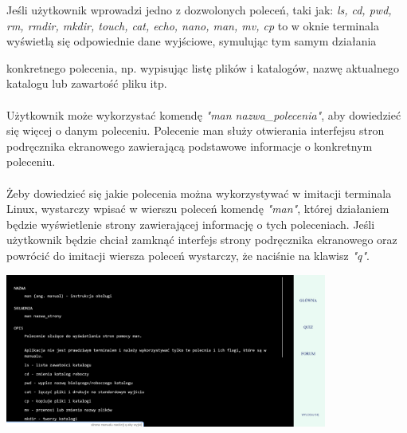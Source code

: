 \documentclass[10pt,a4paper]{report}
\begin{document}
\begin{adjustwidth}{2cm}{2cm}
\begin{minipage}{\linewidth}
\begin{center}
\end{center}
\end{minipage}
\begin{minipage}{1\linewidth}
\vspace{0.3cm}
 Jeśli użytkownik wprowadzi jedno z dozwolonych poleceń, taki jak: \textit{ls, cd, pwd, rm, rmdir, mkdir, touch, cat, echo, nano, man, mv, cp } to w oknie terminala wyświetlą się odpowiednie dane wyjściowe, symulując tym samym działania
 \end{minipage}
 \begin{minipage}{1\linewidth}
 konkretnego polecenia, np. wypisując listę plików i katalogów, nazwę aktualnego katalogu lub zawartość pliku itp. \\ \\
Użytkownik może wykorzystać komendę \textit{"man nazwa\_polecenia"}, aby dowiedzieć się więcej o danym poleceniu. Polecenie man służy otwierania interfejsu stron podręcznika ekranowego zawierającą podstawowe informacje o konkretnym poleceniu. \\ \\
Żeby dowiedzieć się jakie polecenia można wykorzystywać w imitacji terminala Linux, wystarczy wpisać w wierszu poleceń komendę \textit{"man"}, której działaniem będzie wyświetlenie strony zawierającej informację o tych poleceniach. Jeśli użytkownik będzie chciał zamknąć interfejs strony podręcznika ekranowego oraz powrócić do imitacji wiersza poleceń wystarczy, że naciśnie na klawisz \textit{"q"}.\\
\end{minipage}
\begin{minipage}{\linewidth}
\begin{center}
  \includegraphics[width=400px]{project/man.png}
\end{center}
\end{minipage}

\end{adjustwidth}
\end{document}
